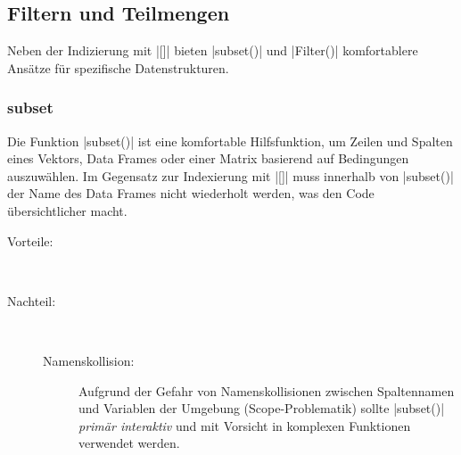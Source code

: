 \documentclass[10pt,twocolumn]{scrartcl}
\renewcommand{\lstinline}{\mycoloredinline}
\begin{document}
\subsection{Filtern und Teilmengen}

Neben der Indizierung mit \lstinline|[]| bieten \lstinline|subset()| und \lstinline|Filter()| komfortablere Ansätze für spezifische Datenstrukturen.

\subsubsection{subset}

Die Funktion \lstinline|subset()| ist eine komfortable Hilfsfunktion, um Zeilen und Spalten eines Vektors, Data Frames oder einer Matrix basierend auf Bedingungen auszuwählen. Im Gegensatz zur Indexierung mit \lstinline|[]| muss innerhalb von \lstinline|subset()| der Name des Data Frames nicht wiederholt werden, was den Code übersichtlicher macht.

\begin{description}
\item[Vorteile:] ~
\item[Nachteil:] ~
  \begin{description}
  \item[Namenskollision:] Aufgrund der Gefahr von Namenskollisionen zwischen Spaltennamen und Variablen der Umgebung (Scope-Problematik) sollte \lstinline|subset()| \emph{primär interaktiv} und mit Vorsicht in komplexen Funktionen verwendet werden.
  \end{description}
\end{description}
\end{document}
